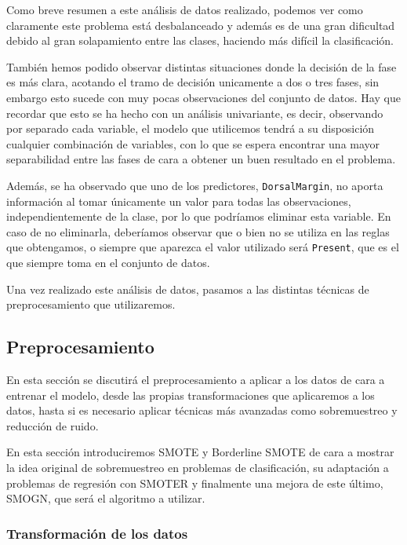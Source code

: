 Como breve resumen a este análisis de datos realizado, podemos ver como claramente este problema está desbalanceado y además es de una gran dificultad debido al gran solapamiento entre las clases, haciendo más difícil la clasificación.

También hemos podido observar distintas situaciones donde la decisión de la fase es más clara, acotando el tramo de decisión unicamente a dos o tres fases, sin embargo esto sucede con muy pocas observaciones del conjunto de datos. Hay que recordar que esto se ha hecho con un análisis univariante, es decir, observando por separado cada variable, el modelo que utilicemos tendrá a su disposición cualquier combinación de variables, con lo que se espera encontrar una mayor separabilidad entre las fases de cara a obtener un buen resultado en el problema.

Además, se ha observado que uno de los predictores, \texttt{DorsalMargin}, no aporta información al tomar únicamente un valor para todas las observaciones, independientemente de la clase, por lo que podríamos eliminar esta variable. En caso de no eliminarla, deberíamos observar que o bien no se utiliza en las reglas que obtengamos, o siempre que aparezca el valor utilizado será \texttt{Present}, que es el que siempre toma en el conjunto de datos.

Una vez realizado este análisis de datos, pasamos a las distintas técnicas de preprocesamiento que utilizaremos.


\subsection{Preprocesamiento} \label{sobremuestreo}

En esta sección se discutirá el preprocesamiento a aplicar a los datos de cara a entrenar el modelo, desde las propias transformaciones que aplicaremos a los datos, hasta si es necesario aplicar técnicas más avanzadas como sobremuestreo y reducción de ruido.

En esta sección introduciremos SMOTE y Borderline SMOTE de cara a mostrar la idea original de sobremuestreo en problemas de clasificación, su adaptación a problemas de regresión con SMOTER y finalmente una mejora de este último, SMOGN, que será el algoritmo a utilizar.

\subsubsection{Transformación de los datos}

